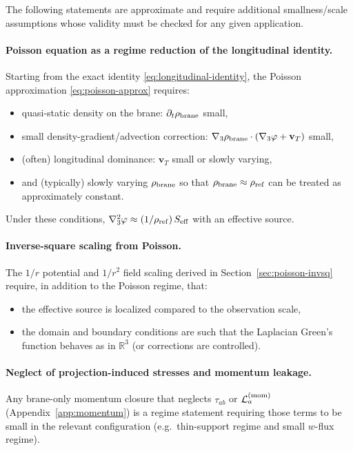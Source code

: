 \documentclass[11pt]{article}
\newcommand{\rhoref}{\rho_{\rm ref}}
\begin{document}
The following statements are approximate and require additional smallness/scale assumptions whose validity must be checked for any given application.

\paragraph{Poisson equation as a regime reduction of the longitudinal identity.}
Starting from the exact identity \eqref{eq:longitudinal-identity}, the Poisson approximation \eqref{eq:poisson-approx} requires:
\begin{itemize}[leftmargin=2.0em]
\item quasi-static density on the brane: $\partial_t\rho_{\rm brane}$ small,
\item small density-gradient/advection correction: $\nabla_3\rho_{\rm brane}\cdot(\nabla_3\varphi+\mathbf{v}_T)$ small,
\item (often) longitudinal dominance: $\mathbf{v}_T$ small or slowly varying,
\item and (typically) slowly varying $\rho_{\rm brane}$ so that $\rho_{\rm brane}\approx\rhoref$ can be treated as approximately constant.
\end{itemize}
Under these conditions, $\nabla_3^2\varphi \approx (1/\rhoref)\,S_{\rm eff}$ with an effective source.

\paragraph{Inverse-square scaling from Poisson.}
The $1/r$ potential and $1/r^2$ field scaling derived in Section~\ref{sec:poisson-invsq} require, in addition to the Poisson regime, that:
\begin{itemize}[leftmargin=2.0em]
\item the effective source is localized compared to the observation scale,
\item the domain and boundary conditions are such that the Laplacian Green's function behaves as in $\mathbb{R}^3$ (or corrections are controlled).
\end{itemize}

\paragraph{Neglect of projection-induced stresses and momentum leakage.}
Any brane-only momentum closure that neglects $\tau_{ab}$ or $\mathcal{L}^{({\rm mom})}_a$ (Appendix~\ref{app:momentum}) is a regime statement requiring those terms to be small in the relevant configuration (e.g.\ thin-support regime and small $w$-flux regime).
\end{document}
